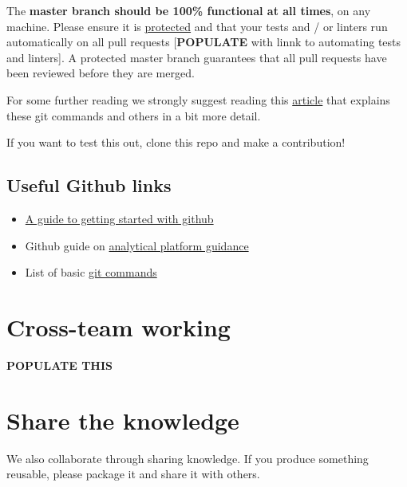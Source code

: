 \documentclass[]{book}
\providecommand{\tightlist}{%
  \setlength{\itemsep}{0pt}\setlength{\parskip}{0pt}}
\begin{document}
The \textbf{master branch should be 100\% functional at all times}, on any machine. Please ensure it is \href{https://help.github.com/articles/about-protected-branches/}{protected} and that your tests and / or linters run automatically on all pull requests {[}\textbf{POPULATE} with linnk to automating tests and linters{]}. A protected master branch guarantees that all pull requests have been reviewed before they are merged.

For some further reading we strongly suggest reading this \href{https://gist.github.com/blackfalcon/8428401}{article} that explains these git commands and others in a bit more detail.

If you want to test this out, clone this repo and make a contribution!

\hypertarget{gitlink}{%
\subsection*{Useful Github links}\label{gitlink}}

\begin{itemize}
\tightlist
\item
  \href{https://jennybc.github.io/2014-05-12-ubc/ubc-r/session2.4_github.html}{A guide to getting started with github}\\
\item
  Github guide on \href{https://user-guidance.services.alpha.mojanalytics.xyz/github.html\#creating-your-project-repo-on-github}{analytical platform guidance}\\
\item
  List of basic \href{https://guides.github.com/introduction/git-handbook/}{git commands}
\end{itemize}

\hypertarget{crossteamworking}{%
\section{Cross-team working}\label{crossteamworking}}

\textbf{POPULATE THIS}

\hypertarget{knowledge}{%
\section{Share the knowledge}\label{knowledge}}

We also collaborate through sharing knowledge. If you produce something reusable, please package it and share it with others.
\end{document}
